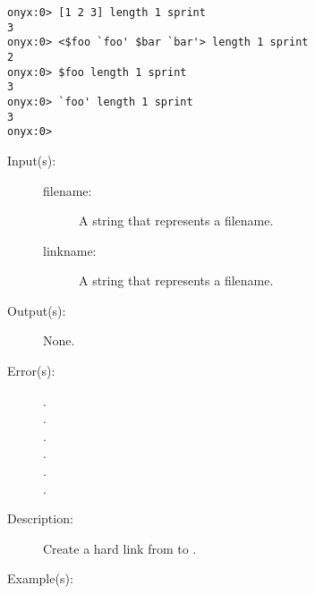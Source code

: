 \begin{description}
\begin{description}
\begin{verbatim}
onyx:0> [1 2 3] length 1 sprint
3
onyx:0> <$foo `foo' $bar `bar'> length 1 sprint
2
onyx:0> $foo length 1 sprint
3
onyx:0> `foo' length 1 sprint
3
onyx:0>
		\end{verbatim}
	\end{description}
\label{systemdict:link}
\item[{\onyxop{filename linkname}{link}{--}}: ]
	\begin{description}\item[]
	\item[Input(s): ]
		\begin{description}\item[]
		\item[filename: ]
			A string that represents a filename.
		\item[linkname: ]
			A string that represents a filename.
		\end{description}
	\item[Output(s): ] None.
	\item[Error(s): ]
		\begin{description}\item[]
		\item[.]
		\item[.]
		\item[.]
		\item[.]
		\item[.]
		\item[.]
		\end{description}
	\item[Description: ]
		Create a hard link from  to .
	\item[Example(s): ]\begin{verbatim}


\end{verbatim}
\end{description}
\end{description}
